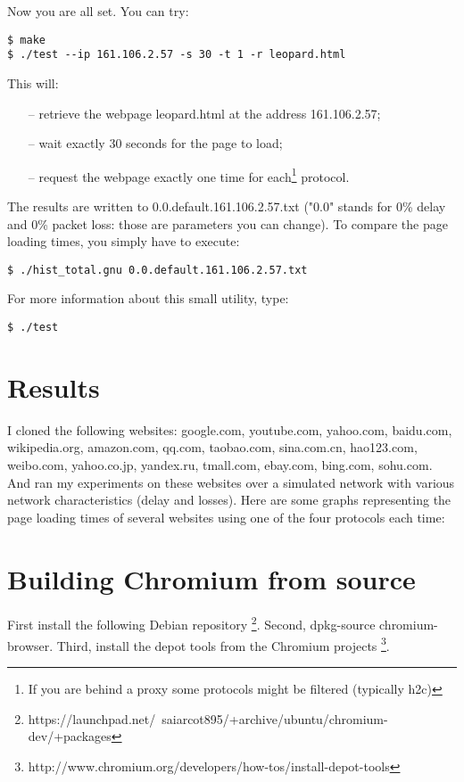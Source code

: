 \documentclass[12pt, notitlepage]{article}
\begin{document}
Now you are all set. You can try: 
\begin{lstlisting}
$ make
$ ./test --ip 161.106.2.57 -s 30 -t 1 -r leopard.html
\end{lstlisting}

\vspace*{0.5cm}
This will: 
\begin{itemize}[noitemsep]
\item[--] retrieve the webpage leopard.html at the address 
161.106.2.57;
\item[--] wait exactly 30 seconds for the page to load;
\item[--] request the webpage exactly one time for each\footnote{If you are
behind a proxy some protocols might be filtered (typically h2c)}
protocol.
\end{itemize}

The results are written to 0.0.default.161.106.2.57.txt ("0.0" stands for
0\% delay and 0\% packet loss: those are parameters you can change). To
compare the page loading times, you simply have to execute:
\begin{lstlisting}
$ ./hist_total.gnu 0.0.default.161.106.2.57.txt
\end{lstlisting}
For more information about this small utility, type:
\begin{lstlisting}
$ ./test
\end{lstlisting}

\newpage

\section{Results}
I cloned the following websites:
google.com, youtube.com, yahoo.com, baidu.com, wikipedia.org, amazon.com, qq.com, taobao.com, sina.com.cn, hao123.com, weibo.com, yahoo.co.jp, yandex.ru, tmall.com, ebay.com, bing.com, sohu.com.\\

And ran my experiments on these websites over a simulated network with 
various network characteristics (delay and losses).
Here are some graphs representing the page loading times of several
websites using one of the four protocols each time:

\section{Building Chromium from source}

First install the following Debian repository
\footnote{https://launchpad.net/~saiarcot895/+archive/ubuntu/chromium-dev/+packages}.
Second, dpkg-source chromium-browser.
Third, install the depot tools from the Chromium projects
\footnote{http://www.chromium.org/developers/how-tos/install-depot-tools}.
\end{document}
